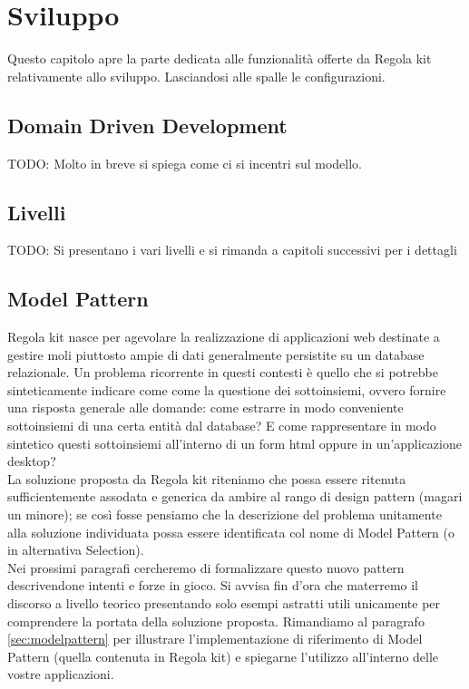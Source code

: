 \chapter{Sviluppo}
Questo capitolo apre la parte dedicata alle funzionalità offerte da Regola kit relativamente allo sviluppo. Lasciandosi alle spalle le configurazioni.

\section{Domain Driven Development}
TODO: Molto in breve si spiega come ci si incentri sul modello.

\section{Livelli}
TODO: Si presentano i vari livelli e si rimanda a capitoli successivi per i dettagli

\section{Model Pattern}\label{sec:modelpatternTeoria}
Regola kit nasce per agevolare la realizzazione di applicazioni web destinate a gestire moli piuttosto ampie di dati generalmente persistite su un database relazionale. Un problema ricorrente in questi contesti è quello che si potrebbe sinteticamente indicare come  come la questione dei sottoinsiemi, ovvero fornire una risposta generale alle domande:  come estrarre in modo conveniente sottoinsiemi di una certa entità dal database? E come rappresentare in modo sintetico questi sottoinsiemi all'interno di un form html oppure in un'applicazione desktop?
\\
La soluzione proposta da Regola kit  riteniamo che possa essere ritenuta sufficientemente assodata e generica da ambire al rango di design pattern (magari un minore); se così fosse pensiamo che la descrizione del problema unitamente alla soluzione individuata possa essere identificata col nome di Model Pattern (o in alternativa Selection).\\
 
Nei prossimi paragrafi cercheremo di formalizzare questo nuovo pattern descrivendone intenti e forze in gioco. Si avvisa fin d'ora che materremo il discorso a livello teorico presentando solo esempi astratti utili unicamente per comprendere la portata della soluzione proposta. Rimandiamo al paragrafo \vref{sec:modelpattern} per illustrare l'implementazione di riferimento di Model Pattern (quella contenuta in Regola kit) e spiegarne l'utilizzo all'interno delle vostre applicazioni. 

